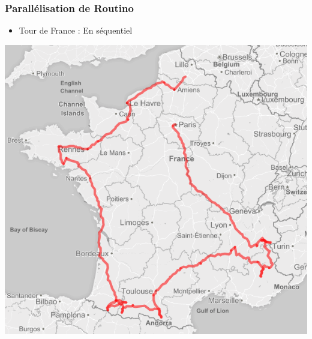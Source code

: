 
\begin{frame}
  \frametitle{Parallélisation de Routino}

  \begin{itemize}
  \item Tour de France : En séquentiel
  \end{itemize}

  \begin{center}
    \includegraphics[scale=0.33]{include/tourfrance_mono.png}
  \end{center}

\end{frame}


